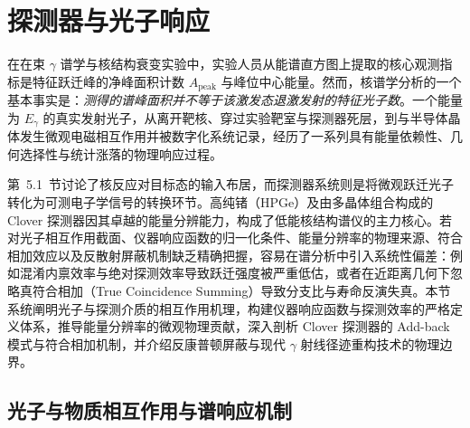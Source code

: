 \section{探测器与光子响应}\label{sec:5-2}

在在束 $\gamma$ 谱学与核结构衰变实验中，实验人员从能谱直方图上提取的核心观测指标是特征跃迁峰的净峰面积计数 $A_{\mathrm{peak}}$ 与峰位中心能量。然而，核谱学分析的一个基本事实是：\emph{测得的谱峰面积并不等于该激发态退激发射的特征光子数}。一个能量为 $E_\gamma$ 的真实发射光子，从离开靶核、穿过实验靶室与探测器死层，到与半导体晶体发生微观电磁相互作用并被数字化系统记录，经历了一系列具有能量依赖性、几何选择性与统计涨落的物理响应过程。

第~5.1~节讨论了核反应对目标态的输入布居，而探测器系统则是将微观跃迁光子转化为可测电子学信号的转换环节。高纯锗（HPGe）及由多晶体组合构成的 Clover 探测器因其卓越的能量分辨能力，构成了低能核结构谱仪的主力核心。若对光子相互作用截面、仪器响应函数的归一化条件、能量分辨率的物理来源、符合相加效应以及反散射屏蔽机制缺乏精确把握，容易在谱分析中引入系统性偏差：例如混淆内禀效率与绝对探测效率导致跃迁强度被严重低估，或者在近距离几何下忽略真符合相加（True Coincidence Summing）导致分支比与寿命反演失真。本节系统阐明光子与探测介质的相互作用机理，构建仪器响应函数与探测效率的严格定义体系，推导能量分辨率的微观物理贡献，深入剖析 Clover 探测器的 Add-back 模式与符合相加机制，并介绍反康普顿屏蔽与现代 $\gamma$ 射线径迹重构技术的物理边界。

\subsection{光子与物质相互作用与谱响应机制}\label{subsec:5-2-1}

